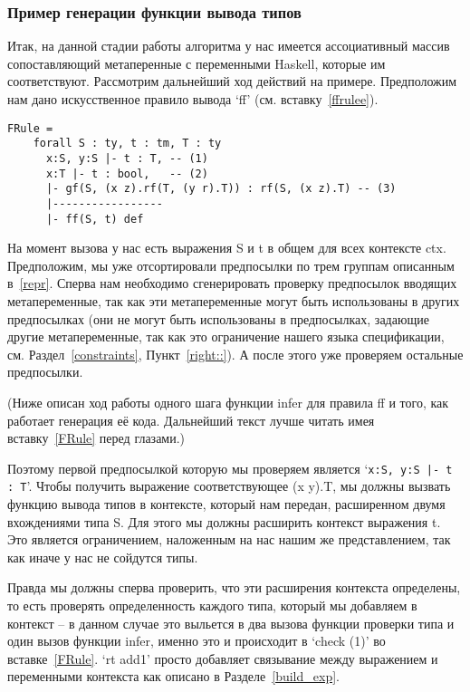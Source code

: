 \subsubsection{Пример генерации функции вывода типов}
Итак, на данной стадии работы алгоритма у нас имеется ассоциативный массив сопоставляющий метаперенные с переменными Haskell, которые им соответствуют. Рассмотрим дальнейший ход действий на примере. Предположим нам дано искусственное правило вывода `ff' (см. вставку~\ref{ffrulee}).

\begin{lstlisting}[label={ffrulee}, caption={Искусственное правило вывода для конструкции `ff'},captionpos=b, frame=single, float, floatplacement=H]
FRule =
    forall S : ty, t : tm, T : ty
      x:S, y:S |- t : T, -- (1)
      x:T |- t : bool,   -- (2)
      |- gf(S, (x z).rf(T, (y r).T)) : rf(S, (x z).T) -- (3)
      |-----------------
      |- ff(S, t) def
\end{lstlisting}

На момент вызова у нас есть выражения S и t в общем для всех контексте ctx. Предположим, мы уже отсортировали предпосылки по трем группам описанным в~\ref{repr}. Сперва нам необходимо сгенерировать проверку предпосылок вводящих метапеременные, так как эти метапеременные могут быть использованы в других предпосылках (они не могут быть использованы в предпосылках, задающие другие метапеременные, так как это ограничение нашего языка спецификации, см. Раздел~\ref{constraints}, Пункт~\ref{right::}). А после этого уже проверяем остальные предпосылки.

(Ниже описан ход работы одного шага функции infer для правила ff и того, как работает генерация её кода. Дальнейший текст лучше читать имея вставку~\ref{FRule} перед глазами.)

Поэтому первой предпосылкой которую мы проверяем является `\lstinline{x:S, y:S |- t : T}'. Чтобы получить выражение соответствующее (x y).T, мы должны вызвать функцию вывода типов в контексте, который нам передан, расширенном двумя вхождениями типа S. Для этого мы должны расширить контекст выражения t. Это является ограничением, наложенным на нас нашим же представлением, так как иначе у нас не сойдутся типы.

Правда мы должны сперва проверить, что эти расширения контекста определены, то есть проверять определенность каждого типа, который мы добавляем в контекст -- в данном случае это выльется в два вызова функции проверки типа и один вызов функции infer, именно это и происходит в `check (1)' во вставке~\ref{FRule}. `rt add1' просто добавляет связывание между выражением и переменными контекста как описано в Разделе~\ref{build_exp}.

